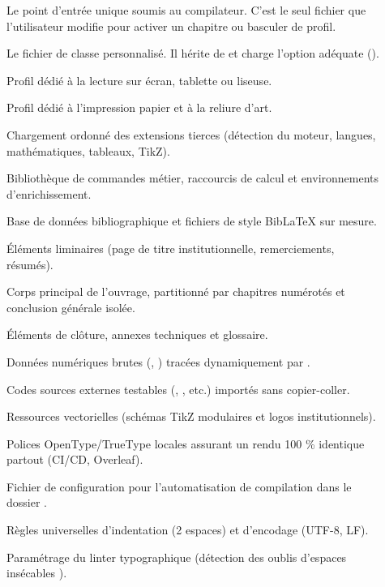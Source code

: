 \begin{description}
  \item[] Le point d'entrée unique soumis au compilateur.
  C'est le seul fichier que l'utilisateur modifie pour activer un chapitre ou basculer de profil.
  \item[] Le fichier de classe personnalisé.
  Il hérite de  et charge l'option adéquate ().
  \item[] Profil dédié à la lecture sur écran, tablette ou liseuse.
  \item[] Profil dédié à l'impression papier et à la reliure d'art.
  \item[] Chargement ordonné des extensions tierces
  (détection du moteur, langues, mathématiques, tableaux, TikZ).
  \item[] Bibliothèque de commandes métier, raccourcis de calcul et environnements d'enrichissement.
  \item[] Base de données bibliographique et fichiers de style Bib\LaTeX{} sur mesure.
  \item[] Éléments liminaires (page de titre institutionnelle, remerciements, résumés).
  \item[] Corps principal de l'ouvrage, partitionné par chapitres numérotés et conclusion générale isolée.
  \item[] Éléments de clôture, annexes techniques et glossaire.
  \item[] Données numériques brutes (, ) tracées dynamiquement par .
  \item[] Codes sources externes testables (, , etc.) importés sans copier-coller.
  \item[] Ressources vectorielles (schémas TikZ modulaires et logos institutionnels).
  \item[] Polices OpenType/TrueType locales assurant un rendu 100 \% identique partout (CI/CD, Overleaf).
  \item[] Fichier de configuration pour l'automatisation de compilation dans le dossier .
  \item[] Règles universelles d'indentation (2 espaces) et d'encodage (UTF-8, LF).
  \item[] Paramétrage du linter typographique (détection des oublis d'espaces insécables \code{\textasciitilde}).
\end{description}

